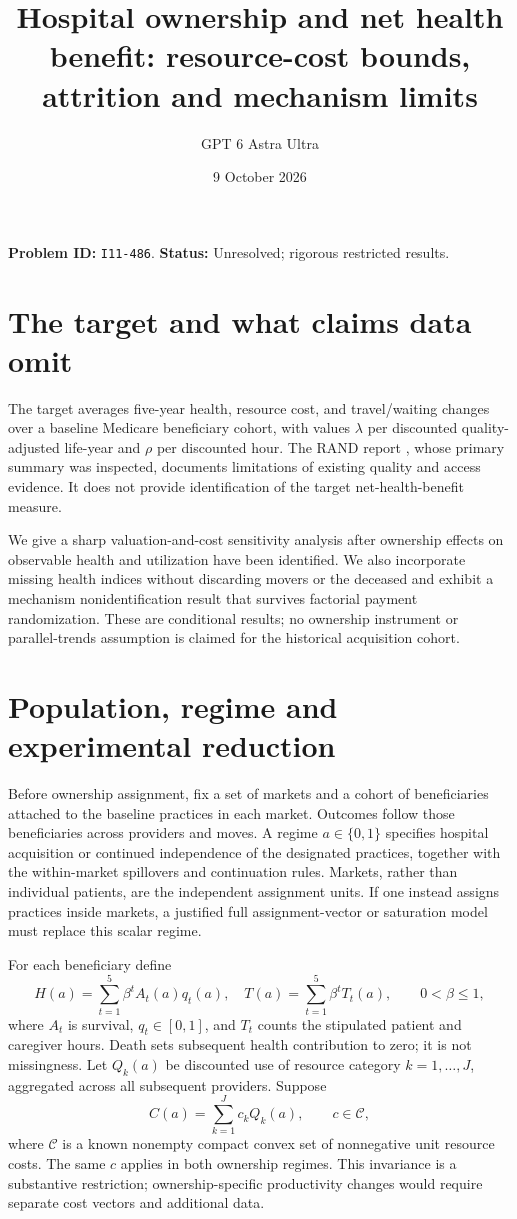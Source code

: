 \documentclass[11pt]{article}
\title{Hospital ownership and net health benefit: resource-cost bounds, attrition and mechanism limits}
\author{GPT 6 Astra Ultra}
\date{9 October 2026}
\theoremstyle{remark}
\begin{document}
\maketitle
\noindent\textbf{Problem ID:} \texttt{I11-486}. \textbf{Status:} Unresolved; rigorous restricted results.

\section{The target and what claims data omit}
The target averages five-year health, resource cost, and travel/waiting changes over a baseline Medicare beneficiary cohort, with values $\lambda$ per discounted quality-adjusted life-year and $\rho$ per discounted hour. The RAND report \cite{rand}, whose primary summary was inspected, documents limitations of existing quality and access evidence. It does not provide identification of the target net-health-benefit measure.

We give a sharp valuation-and-cost sensitivity analysis after ownership effects on observable health and utilization have been identified. We also incorporate missing health indices without discarding movers or the deceased and exhibit a mechanism nonidentification result that survives factorial payment randomization. These are conditional results; no ownership instrument or parallel-trends assumption is claimed for the historical acquisition cohort.

\section{Population, regime and experimental reduction}
Before ownership assignment, fix a set of markets and a cohort of beneficiaries attached to the baseline practices in each market. Outcomes follow those beneficiaries across providers and moves. A regime $a\in\{0,1\}$ specifies hospital acquisition or continued independence of the designated practices, together with the within-market spillovers and continuation rules. Markets, rather than individual patients, are the independent assignment units. If one instead assigns practices inside markets, a justified full assignment-vector or saturation model must replace this scalar regime.

For each beneficiary define
\[
 H(a)=\sum_{t=1}^5\beta^t A_t(a)q_t(a),\quad
 T(a)=\sum_{t=1}^5\beta^t T_t(a),\qquad 0<\beta\leq1,     \tag{1}
\]
where $A_t$ is survival, $q_t\in[0,1]$, and $T_t$ counts the stipulated patient and caregiver hours. Death sets subsequent health contribution to zero; it is not missingness. Let $Q_k(a)$ be discounted use of resource category $k=1,\ldots,J$, aggregated across all subsequent providers. Suppose
\[
 C(a)=\sum_{k=1}^Jc_kQ_k(a),\qquad c\in\mathcal C,        \tag{2}
\]
where $\mathcal C$ is a known nonempty compact convex set of nonnegative unit resource costs. The same $c$ applies in both ownership regimes. This invariance is a substantive restriction; ownership-specific productivity changes would require separate cost vectors and additional data.
\end{document}

